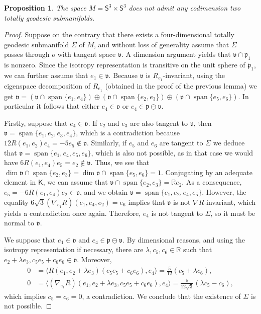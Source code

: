 \documentclass[11pt,a4paper,final]{amsart}
\newcommand{\g}{\mathfrak}
\newcommand{\R}{\mathbb{R}}
\newcommand{\vecspan}{\operatorname{span}}
\newcommand{\spann}{\operatorname{span}}
\newtheorem{proposition}[theorem]{Proposition}
\theoremstyle{definition}
\begin{document}
\begin{proposition}
	\label{prop:4tgs3s3}
	The space $M=\mathsf{S}^{3}\times\mathsf{S}^{3}$ does not admit any codimension two totally geodesic submanifolds.
\end{proposition}
\begin{proof}
	Suppose on the contrary that there exists a four-dimensional totally geodesic submanifold $\Sigma$ of $M$, and without loss of generality assume that $\Sigma$ passes through $o$ with tangent space $\g{v}$.
	A dimension argument yields that $\g{v}\cap \g{p}_{1}$ is nonzero.
	Since the isotropy representation is transitive on the unit sphere of $\g{p}_{1}$, we can further assume that $e_{1}\in \g{v}$.
	Because $\g{v}$ is $R_{e_{1}}$-invariant, using the eigenspace decomposition of $R_{e_{1}}$ (obtained in the proof of the previous lemma) we get $\g{v}=(\g{v}\cap\spann\{e_1,e_4\})\oplus(\g{v}\cap\spann\{e_2,e_3\})\oplus(\g{v}\cap\spann\{e_5,e_6\})$.
	In particular it follows that either $e_{4}\in \g{v}$ or $e_{4}\in\g{p}\ominus \g{v}$. 
		
	Firstly, suppose that $e_{4}\in \g{v}$.
	If $e_{2}$ and $e_{3}$ are also tangent to $\g{v}$, then  $\g{v}=\vecspan\{e_{1},e_{2},e_{3},e_{4}\}$, which is a contradiction because $12 R(e_{1},e_{2})e_{4}=-5e_{5}\notin \g{v}$.
	Similarly, if $e_{5}$ and $e_{6}$ are tangent to $\Sigma$ we deduce that $\g{v}=\vecspan\{e_{1},e_{4},e_{5},e_{6}\}$, which is also not possible, as in that case we would have $6R(e_{1},e_{4})e_{5}=e_{2}\notin \g{v}$.
	Thus, we see that $\dim \g{v}\cap \vecspan\{e_{2},e_{3}\}=\dim \g{v}\cap \vecspan\{e_{5},e_{6}\}=1$.
	Conjugating by an adequate element in $\mathsf{K}$, we can assume that $\g{v}\cap \vecspan\{e_{2},e_{3}\}=\R e_{2}$.
	As a consequence, $e_{5}=-6R(e_{1},e_{4})e_{2}\in \g{v}$, and we obtain $\g{v}=\vecspan\{e_{1},e_{2},e_{4},e_{5}\}$.
	However, the equality $6\sqrt{3}(\nabla_{e_{1}}R)(e_{1},e_{4},e_{2})=e_{6}$ implies that $\g{v}$ is not $\nabla R$-invariant, which yields a contradiction once again.
	Therefore, $e_{4}$ is not tangent to $\Sigma$, so it must be normal to $\g{v}$.
		
	We suppose that $e_{1}\in \g{v}$ and $e_{4}\in \g{p}\ominus \g{v}$.
	By dimensional reasons, and using the isotropy representation if necessary, there are $\lambda,c_{5},c_{6}\in \R$ such that $e_2 +\lambda e_3,c_{5} e_5 + c_{6} e_6\in \g{v}$. Moreover,
	\begin{align*}
		0&=\langle R(e_1,e_2 +\lambda e_3)(c_{5}e_5 + c_{6} e_6),e_4\rangle=\frac{5}{12}\left(c_{5}+\lambda c_{6}\right),\\
		0&=\langle (\nabla_{e_1} R)(e_1, e_2 +\lambda e_3, c_{5} e_5 + c_{6} e_6),e_4\rangle=\frac{5}{12\sqrt{3}}\left(\lambda c_{5}-c_{6} \right),
		\end{align*}
	which implies $c_{5}=c_{6}=0$, a contradiction.
We conclude that the existence of $\Sigma$ is not possible. \qedhere
\end{proof}
\end{document}
